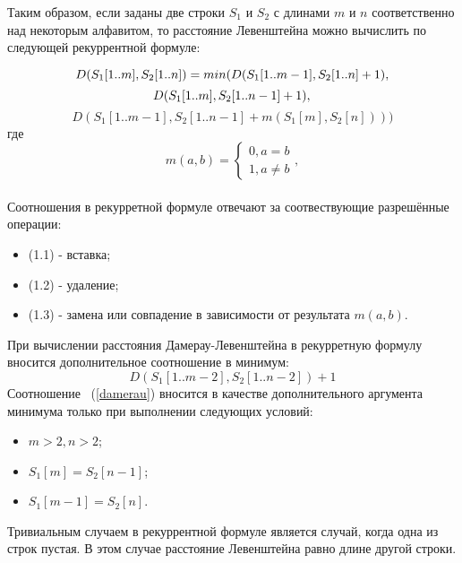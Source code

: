 ﻿\documentclass[12pt]{report}
\begin{document}
	Таким образом, если заданы две строки $S_{1}$ и $S_{2}$ с длинами $m$ и $n$ соответственно над некоторым алфавитом, то расстояние Левенштейна можно вычислить по следующей рекуррентной формуле:

	\begin{equation}
	D(S_{1}[1..m], S_{2}[1..n]) = min(D(S_{1}[1..m-1], S_{2}[1..n] + 1),\\
	\end{equation}
	\begin{equation}
	D(S_{1}[1..m], S_{2}[1..n-1]+1),\\
	\end{equation}
	\begin{equation}
	D(S_{1}[1..m-1], S_{2}[1..n-1]+m(S_{1}[m], S_{2}[n])))
	\end{equation}
	где
	\begin{displaymath}
	m(a,b) = \left\{
	\begin{array}{ll}
		0, a=b\\
		1, a \neq b
	\end{array} \right.,
	\end{displaymath}\ \\
	Соотношения в рекурретной формуле отвечают за соотвествующие разрешённые операции:
	\begin{itemize}
		\item (1.1) - вставка;
		\item (1.2) - удаление;
		\item (1.3) - замена или совпадение в зависимости от результата $m(a,b)$.	
	\end{itemize}

	При вычислении расстояния Дамерау-Левенштейна в рекурретную формулу вносится дополнительное соотношение в минимум:
	\begin{equation}
	\label{damerau}
	D(S_{1}[1..m-2], S_{2}[1..n-2])+1
	\end{equation}
Соотношение ~(\ref{damerau}) вносится в качестве дополнительного аргумента минимума только при выполнении следующих условий:
	\begin{itemize}
		\item $m > 2,n > 2$;
		\item $S_{1}[m] = S_{2}[n-1]$;
		\item $S_{1}[m-1] = S_{2}[n]$.	
	\end{itemize}

	Тривиальным случаем в рекуррентной формуле является случай, когда одна из строк пустая. В этом случае расстояние Левенштейна равно длине другой строки.
\end{document}
